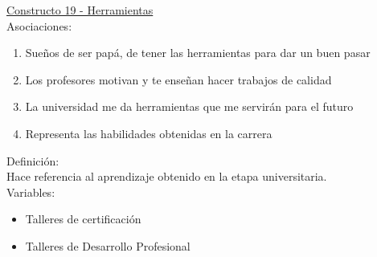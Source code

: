 \underline {Constructo 19 - Herramientas} \\
Asociaciones:
\begin{enumerate}
	\item Sueños de ser papá, de tener las herramientas para dar un buen pasar
	\item Los profesores motivan y te enseñan hacer trabajos de calidad	
	\item La universidad me da herramientas que me servirán para el futuro
	\item Representa las habilidades obtenidas en la carrera
\end{enumerate}

Definición:\\

Hace referencia al aprendizaje obtenido en la etapa universitaria.\\

Variables:\\
\begin{itemize}
	\item Talleres de certificación
	\item Talleres de Desarrollo Profesional	
\end{itemize} 

